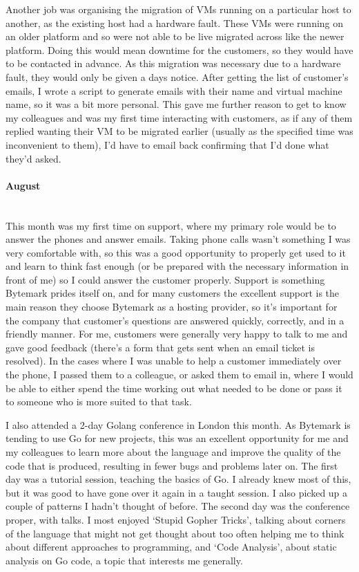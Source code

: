 \documentclass[12pt,a4paper]{article}
\newcommand{\paragraphnl}[1]{\paragraph{#1}\mbox{}\\}
\begin{document}
	Another job was organising the migration of VMs running on a particular
	host to another, as the existing host had a hardware fault. These VMs were
	running on an older platform and so were not able to be live migrated
	across like the newer platform. Doing this would mean downtime for the
	customers, so they would have to be contacted in advance. As this migration
	was necessary due to a hardware fault, they would only be given a days
	notice. After getting the list of customer's emails, I wrote a script to
	generate emails with their name and virtual machine name, so it was a bit
	more personal. This gave me further reason to get to know my colleagues and
	was my first time interacting with customers, as if any of them replied
	wanting their VM to be migrated earlier (usually as the specified time was
	inconvenient to them), I'd have to email back confirming that I'd done what
	they'd asked.

\paragraphnl{August}
	This month was my first time on support, where my primary role would be to
	answer the phones and answer emails. Taking phone calls wasn't something I
	was very comfortable with, so this was a good opportunity to properly get
	used to it and learn to think fast enough (or be prepared with the
	necessary information in front of me) so I could answer the customer
	properly. Support is something Bytemark prides itself on, and for many
	customers the excellent support is the main reason they choose Bytemark as
	a hosting provider, so it's important for the company that customer's
	questions are answered quickly, correctly, and in a friendly manner. For
	me, customers were generally very happy to talk to me and gave good
	feedback (there's a form that gets sent when an email ticket is resolved).
	In the cases where I was unable to help a customer immediately over the
	phone, I passed them to a colleague, or asked them to email in, where I
	would be able to either spend the time working out what needed to be done
	or pass it to someone who is more suited to that task.

	I also attended a 2-day Golang conference in London this month. As Bytemark
	is tending to use Go for new projects, this was an excellent opportunity
	for me and my colleagues to learn more about the language and improve the
	quality of the code that is produced, resulting in fewer bugs and problems
	later on. The first day was a tutorial session, teaching the basics of Go.
	I already knew most of this, but it was good to have gone over it again
	in a taught session. I also picked up a couple of patterns I hadn't thought
	of before. The second day was the conference proper, with talks. I most
	enjoyed `Stupid Gopher Tricks', talking about corners of the language that
	might not get thought about too often helping me to think about	different
	approaches to programming, and `Code Analysis', about static analysis on
	Go code, a topic that interests me generally.
\end{document}
